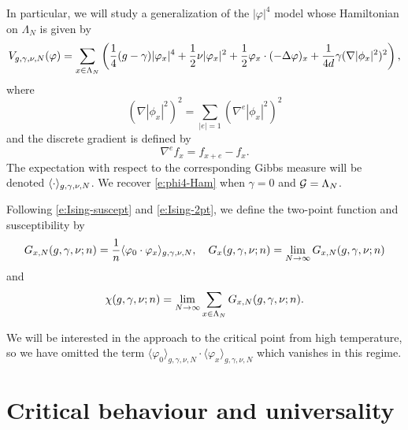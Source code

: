 In particular, we will study a generalization of the $|\varphi|^4$ model whose Hamiltonian
on $\Lambda_N$ is given by
\begin{equation}
\label{e:Vdef1}
V_{g,\gamma,\nu,N}(\varphi)
	=
\sum_{x\in\Lambda_N}
\left(
	\frac{1}{4} (g - \gamma) |\varphi_x|^4
		+
	\frac{1}{2} \nu |\varphi_x|^2
		+
	\frac{1}{2} \varphi_x \cdot (-\Delta \varphi)_x
		+
	\frac{1}{4 d} \gamma (\nabla |\phi_x|^2)^2
\right),
\end{equation}
where
\begin{equation}
(\nabla |\phi_x|^2)^2
	=
\sum_{|e|=1} (\nabla^e |\phi_x|^2)^2
\end{equation}
and the discrete gradient is defined by
\begin{equation}
\nabla^e f_x = f_{x+e} - f_x.
\end{equation}
The expectation with respect to the corresponding Gibbs measure will
be denoted $\langle\cdot\rangle_{g,\gamma,\nu,N}$.
We recover \eqref{e:phi4-Ham} when $\gamma = 0$ and $\mathcal{G} = \Lambda_N$.

Following \eqref{e:Ising-suscept} and \eqref{e:Ising-2pt}, we define the
two-point function and susceptibility by
\begin{equation}
\label{e:two-point-function-phi4}
G_{x, N}(g,\gamma,\nu; n)
	=
\frac{1}{n} \langle \varphi_0 \cdot \varphi_x \rangle_{g,\gamma,\nu,N},
	\quad
G_x(g,\gamma,\nu; n)
	=
\lim_{N \rightarrow \infty} G_{x, N}(g,\gamma,\nu; n)
\end{equation}
and
\begin{equation}
\label{e:susceptibility-def}
\chi(g, \gamma, \nu; n)
	=
\lim_{N\rightarrow\infty} \sum_{x\in\Lambda_N} G_{x,N}(g, \gamma, \nu; n).
\end{equation}

\begin{rk}
We will be interested in the approach to the critical point from high temperature,
so we have omitted the term
$\langle \varphi_0 \rangle_{g,\gamma,\nu,N} \cdot \langle \varphi_x \rangle_{g,\gamma,\nu,N}$
which vanishes in this regime.
\end{rk}


\section{Critical behaviour and universality}
\label{sec:crit}

